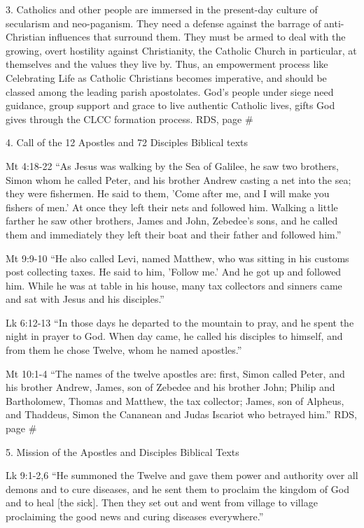 \documentclass[oneside]{book}
\begin{document}
3. Catholics and other people are immersed in the present-day culture of
secularism and neo-paganism. They need a defense against the barrage of
anti-Christian influences that surround them. They must be armed to deal with
the growing, overt hostility against Christianity, the Catholic Church in
particular, at themselves and the values they live by. Thus, an empowerment
process like Celebrating Life as Catholic Christians becomes imperative, and
should be classed among the leading parish apostolates. God's people under siege
need guidance, group support and grace to live authentic Catholic lives, gifts
God gives through the CLCC formation process.
RDS, page \#

4. Call of the 12 Apostles and 72 Disciples
Biblical texts

Mt 4:18-22
``As Jesus was walking by the Sea of Galilee, he saw two brothers, Simon whom he
called Peter, and his brother Andrew casting a net into the sea; they were
fishermen. He said to them, 'Come after me, and I will make you fishers of men.'
At once they left their nets and followed him. Walking a little farther he saw
other brothers, James and John, Zebedee's sons, and he called them and
immediately they left their boat and their father and followed him.''

Mt 9:9-10
``He also called Levi, named Matthew, who was sitting in his customs post
collecting taxes. He said to him, 'Follow me.' And he got up and followed
him. While he was at table in his house, many tax collectors and sinners came
and sat with Jesus and his disciples.''

Lk 6:12-13
``In those days he departed to the mountain to pray, and he spent the night in
prayer to God. When day came, he called his disciples to himself, and from them
he chose Twelve, whom he named apostles.''

Mt 10:1-4
``The names of the twelve apostles are: first, Simon called Peter, and his
brother Andrew, James, son of Zebedee and his brother John; Philip and
Bartholomew, Thomas and Matthew, the tax collector; James, son of Alpheus, and
Thaddeus, Simon the Cananean and Judas Iscariot who betrayed him.''
RDS, page \#

5. Mission of the Apostles and Disciples
Biblical Texts

Lk 9:1-2,6
``He summoned the Twelve and gave them power and authority over all demons and
to cure diseases, and he sent them to proclaim the kingdom of God and to heal
[the sick]. Then they set out and went from village to village proclaiming the
good news and curing diseases everywhere.''
\end{document}
